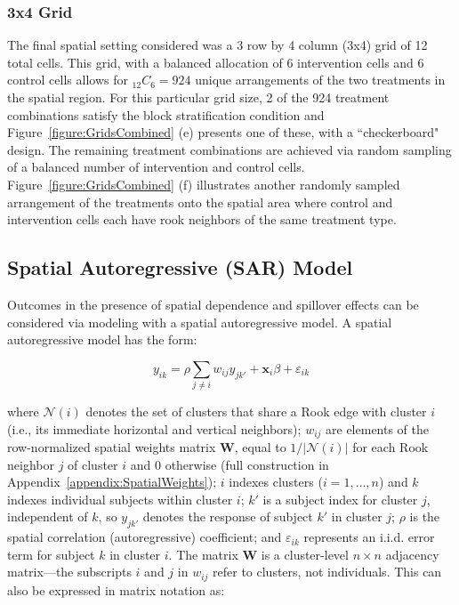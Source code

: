 \documentclass{article}[11pt]
\begin{document}
\subsubsection{3x4 Grid}

The final spatial setting considered was a 3 row by 4 column (3x4) grid of 12 total cells. This grid, with a balanced allocation of 6 intervention cells and 6 control cells allows for %
$_{12}C_{6}=924$ unique arrangements of the two treatments in the spatial region. For this particular grid size, 2 of the 924 treatment combinations satisfy the block stratification condition and Figure~\ref{figure:GridsCombined} (e) presents one of these, with a ``checkerboard" design. The remaining treatment combinations are achieved via random sampling of a balanced number of intervention and control cells. Figure~\ref{figure:GridsCombined} (f) illustrates another randomly sampled arrangement of the treatments onto the spatial area where control and intervention cells each have rook neighbors of the same treatment type.

\subsection{Spatial Autoregressive (SAR) Model}\label{section:SAR}

Outcomes in the presence of spatial dependence and spillover effects can be considered via modeling with a spatial autoregressive model\cite{waller_applied_2004}\cite{fotheringham_sage_2009}\cite{ullah_handbook_1998}. A spatial autoregressive model has the form:

\begin{equation}\label{Equation:SARmodel}
    y_{ik} = \rho\sum_{j \neq i} w_{ij}y_{jk'} + \mathbf{x}_i \beta + \varepsilon_{ik}
\end{equation}

\noindent where $\mathcal{N}(i)$ denotes the set of clusters that share a Rook edge with cluster $i$ (i.e., its immediate horizontal and vertical neighbors); $w_{ij}$ are elements of the row-normalized spatial weights matrix $\mathbf{W}$, equal to $1/|\mathcal{N}(i)|$ for each Rook neighbor $j$ of cluster $i$ and 0 otherwise (full construction in Appendix~\ref{appendix:SpatialWeights}); $i$ indexes clusters ($i = 1, \ldots, n$) and $k$ indexes individual subjects within cluster $i$; $k'$ is a subject index for cluster $j$, independent of $k$, so $y_{jk'}$ denotes the response of subject $k'$ in cluster $j$; $\rho$ is the spatial correlation (autoregressive) coefficient; and $\varepsilon_{ik}$ represents an i.i.d. error term for subject $k$ in cluster $i$. The matrix $\mathbf{W}$ is a cluster-level $n \times n$ adjacency matrix---the subscripts $i$ and $j$ in $w_{ij}$ refer to clusters, not individuals. This can also be expressed in matrix notation as:
\end{document}
